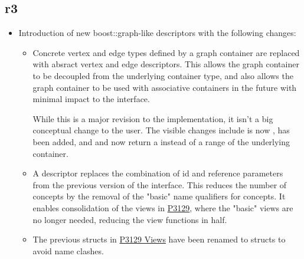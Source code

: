 \subsection*{\paperno r3}

\begin{itemize}
      \item Introduction of new boost::graph-like descriptors with the following changes:
            \begin{itemize}
                  \item Concrete vertex and edge types defined by a graph container are replaced with absract 
                        vertex and edge descriptors. This allows the graph container to be decoupled from the 
                        underlying container type, and also allows the graph container to be used with associative 
                        containers in the future with minimal impact to the interface.

                        While this is a major revision to the implementation, it isn't a big conceptual change to the 
                        user. The visible changes include  is now , 
                         has been added,
                        and  and  now return a  instead 
                        of a range of the underlying container.
                  \item A descriptor replaces the combination of id and reference parameters from the previous version 
                        of the interface. This reduces the number of concepts by the removal of the "basic" name qualifiers 
                        for concepts. It enables consolidation of the views in \href{https://www.wg21.link/P3129}{P3129},
                        where the "basic" views are no longer needed, reducing the view functions in half.
                  \item The previous  structs in \href{https://www.wg21.link/P3129}{P3129 Views} 
                        have been renamed to  structs to avoid name clashes.
            \end{itemize}
\end{itemize}
